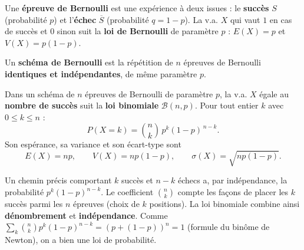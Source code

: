\begin{definition}
Une \textbf{épreuve de Bernoulli} est une expérience à deux issues : le
\textbf{succès} $S$ (probabilité $p$) et l'\textbf{échec} $\overline S$
(probabilité $q=1-p$). La v.a. $X$ qui vaut $1$ en cas de succès et $0$ sinon
suit la \textbf{loi de Bernoulli} de paramètre $p$ : $E(X)=p$ et $V(X)=p(1-p)$.
\end{definition}

\begin{definition}
Un \textbf{schéma de Bernoulli} est la répétition de $n$ épreuves de Bernoulli
\textbf{identiques et indépendantes}, de même paramètre $p$.
\end{definition}

\begin{theoreme}
Dans un schéma de $n$ épreuves de Bernoulli de paramètre $p$, la v.a. $X$ égale
au \textbf{nombre de succès} suit la \textbf{loi binomiale} $\mathcal B(n,p)$.
Pour tout entier $k$ avec $0\le k\le n$ :
\[
P(X=k)=\binom{n}{k}\,p^{k}(1-p)^{\,n-k}.
\]
Son espérance, sa variance et son écart-type sont
\[
E(X)=np,\qquad V(X)=np(1-p),\qquad \sigma(X)=\sqrt{np(1-p)}.
\]
\end{theoreme}

\begin{remarque}
Un chemin précis comportant $k$ succès et $n-k$ échecs a, par indépendance, la
probabilité $p^k(1-p)^{n-k}$. Le coefficient $\binom nk$ compte les façons de
placer les $k$ succès parmi les $n$ épreuves (choix de $k$ positions). La loi
binomiale combine ainsi \textbf{dénombrement} et \textbf{indépendance}. Comme
$\sum_k\binom nk p^k(1-p)^{n-k}=(p+(1-p))^n=1$ (formule du binôme de Newton), on a
bien une loi de probabilité.
\end{remarque}

\begin{illus}
\end{illus}

